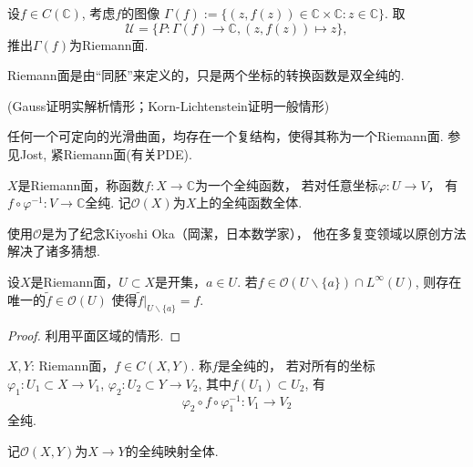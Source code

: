 \begin{example}
	设$f\in C(\mathbb{C})$, 考虑$f$的图像
    $\Gamma(f):=\{(z,f(z))\in \mathbb{C}\times \mathbb{C}:z\in \mathbb{C}\}$. 
    取$$\mathscr{U}=\{P\colon\Gamma(f)\rightarrow \mathbb{C}, (z,f(z))\mapsto z\},$$
	推出$\Gamma(f)$为Riemann面.
\end{example}
		
\begin{remark}
    Riemann面是由“同胚”来定义的，只是两个坐标的转换函数是双全纯的.
\end{remark}
		
		
\begin{theorem}(Gauss证明实解析情形；Korn-Lichtenstein证明一般情形)

	任何一个可定向的光滑曲面，均存在一个复结构，使得其称为一个Riemann面.
	参见Jost, 紧Riemann面(有关PDE).
\end{theorem}
		
\begin{definition}
	$X$是Riemann面，称函数$f\colon X\rightarrow \mathbb{C}$为一个全纯函数，
    若对任意坐标$\varphi\colon U\rightarrow V$，
    有$f\circ \varphi^{-1}\colon V\rightarrow \mathbb{C}$全纯. 
    记$\mathcal{O}(X)$为$X$上的全纯函数全体.
\end{definition}
		
\begin{remark}
	使用$\mathcal{O}$是为了纪念Kiyoshi Oka（岡潔，日本数学家），
    他在多复变领域以原创方法解决了诸多猜想.
\end{remark}
		
\begin{theorem}[Riemann可去奇点定理]
	设$X$是Riemann面，$U\subset X$是开集，$a\in U$. 
    若$f\in \mathcal{O}(U\backslash \{a\})\cap L^\infty(U)$, 
    则存在唯一的$\tilde{f}\in \mathcal{O}(U)$
    使得$\tilde{f}|_{U\backslash \{a\}}=f$.
\end{theorem}
\begin{proof}
    利用平面区域的情形.
\end{proof}
		
\begin{definition}
	$X, Y$: Riemann面，$f\in C(X,Y)$. 称$f$是全纯的，
    若对所有的坐标$\varphi_1\colon U_1\subset X\rightarrow V_1$, 
    $\varphi_2\colon U_2\subset Y\rightarrow V_2$, 其中$f(U_1)\subset U_2$, 有
	$$\varphi_2\circ f \circ \varphi_1^{-1}\colon V_1\rightarrow V_2$$全纯.

	记$\mathcal{O}(X,Y)$为$X\rightarrow Y$的全纯映射全体.
\end{definition}
		
